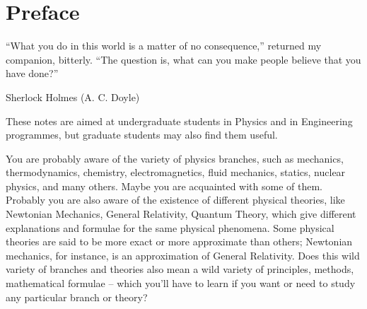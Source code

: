 \documentclass[a4paper,12pt,%
onecolumn,oneside,%
british%
]{memoir}
\newcommand{\addchap}[1]{\chapter*[#1]{#1}\addcontentsline{toc}{chapter}{#1}}
\renewcommand*{\|}[1][]{\nonscript\:#1\vert\nonscript\:\mathopen{}}
\begin{document}
\setlength{\epigraphwidth}{0.67\linewidth}
\epigraphfontsize{\footnotesize}
\setlength{\epigraphrule}{0pt}




\clearpage
{}
\tableofcontents*
\label{sec:toc}

\setcounter{chapter}{-1}


\printpagenotes*
\clearpage
\addchap{Preface}
\label{cha:preface}

\epigraph{\enquote{What you do in this world is a matter of no consequence,} returned my companion, bitterly. \enquote{The question is, what can you make people believe that you have done?\textellipsis}}{Sherlock Holmes (A. C. Doyle) \cites*{doyle1887}}

These notes are aimed at undergraduate students in Physics and in Engineering programmes, but graduate students may also find them useful.

You are probably aware of the variety of physics branches, such as mechanics, thermodynamics, chemistry, electromagnetics, fluid mechanics, statics, nuclear physics, and many others. Maybe you are acquainted with some of them. Probably you are also aware of the existence of different physical theories, like Newtonian Mechanics, General Relativity, Quantum Theory, which give different explanations and formulae for the same physical phenomena. Some physical theories are said to be more exact or more approximate than others; Newtonian mechanics, for instance, is an approximation of General Relativity. Does this wild variety of branches and theories also mean a wild variety of principles, methods, mathematical formulae -- which you'll have to learn if you want or need to study any particular branch or theory?
\end{document}
